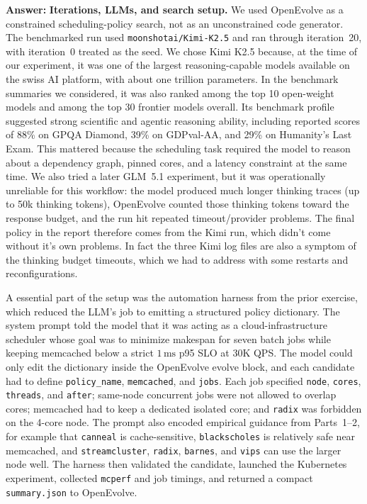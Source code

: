\begin{enumerate}
\begin{enumerate}
         \textbf{Answer:}
         \smallskip
         \noindent\textbf{Iterations, LLMs, and search setup.}
         We used OpenEvolve as a constrained scheduling-policy search, not as an
         unconstrained code generator. The benchmarked run used
         \texttt{moonshotai/Kimi-K2.5} and ran through iteration~20, with
         iteration~0 treated as the seed. We chose Kimi K2.5 because, at the
         time of our experiment, it was one of the largest reasoning-capable
         models available on the swiss AI platform, with about one trillion parameters. In the
         benchmark summaries we considered, it was also ranked among the top 10
         open-weight models and among the top 30 frontier models overall. Its
         benchmark profile suggested strong scientific and agentic reasoning
         ability, including reported scores of 88\% on GPQA Diamond, 39\% on
         GDPval-AA, and 29\% on Humanity's Last Exam. This mattered because the
         scheduling task required the model to reason about a dependency graph,
         pinned cores, and a latency constraint at the same time. We also tried a
         later GLM~5.1 experiment, but it was operationally unreliable for this
         workflow: the model produced much longer thinking traces (up to 50k thinking tokens), OpenEvolve
         counted those thinking tokens toward the response budget, and the run
         hit repeated timeout/provider problems. The final policy in the report
         therefore comes from the Kimi run, which didn't come without it's own problems. In fact the three Kimi log files are also a
         symptom of the thinking budget timeouts, which we had to address with some restarts and reconfigurations.

         A essential part of the setup was the automation harness from the
         prior exercise, which reduced the LLM's job to emitting a structured policy
         dictionary. The system prompt told the model that it was acting as a
         cloud-infrastructure scheduler whose goal was to minimize makespan for
         seven batch jobs while keeping memcached below a strict
         \(1\,\mathrm{ms}\) p95 SLO at 30K QPS. The model could only edit the
         dictionary inside the OpenEvolve evolve block, and each candidate had to
         define \texttt{policy\_name}, \texttt{memcached}, and \texttt{jobs}.
         Each job specified \texttt{node}, \texttt{cores}, \texttt{threads}, and
         \texttt{after}; same-node concurrent jobs were not allowed to overlap
         cores; memcached had to keep a dedicated isolated core; and
         \texttt{radix} was forbidden on the 4-core node. The prompt also encoded
         empirical guidance from Parts~1--2, for example that \texttt{canneal} is
         cache-sensitive, \texttt{blackscholes} is relatively safe near
         memcached, and \texttt{streamcluster}, \texttt{radix}, \texttt{barnes},
         and \texttt{vips} can use the larger node well. The harness then
         validated the candidate, launched the Kubernetes experiment, collected
         \texttt{mcperf} and job timings, and returned a compact
         \texttt{summary.json} to OpenEvolve.


\end{enumerate}
\end{enumerate}
